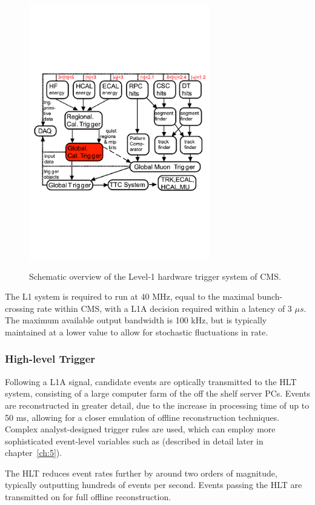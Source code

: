 \begin{figure}[ht!]
  \centering
  \includegraphics[width = 0.7\textwidth]{Figs/trigger/L1_diagram.pdf}
  \label{fig:l1_diagram}
  \caption{Schematic overview of the Level-1 hardware trigger system of CMS.}
\end{figure}

The L1 system is required to run at 40 MHz, equal to the maximal bunch-crossing
rate within CMS, with a L1A decision required within a latency of 3 $\mu s$. The
maximum available output bandwidth is 100 kHz, but is typically maintained at a 
lower value to allow for stochastic fluctuations in rate.

\subsubsection{High-level Trigger}

Following a L1A signal, candidate events are optically transmitted to the HLT 
system, consisting of a large computer farm of the off the shelf server 
PCs. Events are reconstructed in greater detail, due to the increase in 
processing time of up to 50 ms, allowing for a closer emulation of offline 
reconstruction techniques. Complex analyst-designed trigger rules are used, 
which can employ more sophisticated event-level variables such as \alphat
(described in detail later in chapter~\ref{ch:5}).

The HLT reduces event rates further by around two orders of magnitude, typically
outputting hundreds of events per second. Events passing the HLT are transmitted
on for full offline reconstruction.

